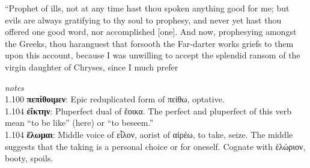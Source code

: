 \documentclass{ransom}
\begin{document}
“Prophet of ills, not at any time hast thou spoken anything good for
me; but evils are always gratifying to thy soul to prophesy, and
never yet hast thou offered one good word, nor accomplished [one]. And
now, prophesying amongst the Greeks, thou haranguest that forsooth the
Far-darter works griefs to them upon this account, because I was
unwilling to accept the splendid ransom of the virgin daughter of
Chryses, since I much prefer
    \par
    \textit{notes}\\
    1.100 \textbf{πεπίθοιμεν}: Epic reduplicated form of πείθω, optative.\\1.104 \textbf{ἐΐκτην}: Pluperfect dual of ἔοικα. The perfect and pluperfect of this verb mean ``to be like'' (here) or ``to beseem.''\\1.104 \textbf{ἕλωμαι}: Middle voice of εἷλον, aorist of αἱρέω, to take, seize. The middle suggests that the taking is a personal choice or for oneself. Cognate with ἑλώριον, booty, spoils.
\end{document}
